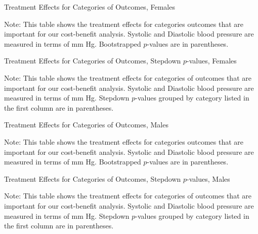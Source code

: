 



\begin{table}[htbp]
\begin{center}
	\caption{Treatment Effects for Categories of Outcomes, Females}\label{tab:select-female}
		\scalebox{0.9}{}
\end{center}
\raggedright \footnotesize
Note: This table shows the treatment effects for categories outcomes that are important for our cost-benefit analysis. Systolic and Diastolic blood pressure are measured in terms of mm Hg. Bootstrapped $p$-values are in parentheses. 
\end{table}

\begin{table}[htbp]
\begin{center}
	\caption{Treatment Effects for Categories of Outcomes, Stepdown $p$-values, Females}\label{tab:select-female-sd}
		\scalebox{0.9}{}
\end{center}
\raggedright \footnotesize
Note: This table shows the treatment effects for categories of outcomes that are important for our cost-benefit analysis. Systolic and Diastolic blood pressure are measured in terms of mm Hg. Stepdown $p$-values grouped by category listed in the first column are in parentheses.
\end{table}

\begin{table}[htbp]
\begin{center}
	\caption{Treatment Effects for Categories of Outcomes, Males}\label{tab:select-male}
		\scalebox{0.9}{}
\end{center}
\raggedright \footnotesize
Note: This table shows the treatment effects for categories outcomes that are important for our cost-benefit analysis. Systolic and Diastolic blood pressure are measured in terms of mm Hg. Bootstrapped $p$-values are in parentheses. 
\end{table}

\begin{table}[htbp]
\begin{center}
	\caption{Treatment Effects for Categories of Outcomes, Stepdown $p$-values, Males}\label{tab:select-male-sd}
		\scalebox{0.9}{}
\end{center}
\raggedright \footnotesize
Note: This table shows the treatment effects for categories of outcomes that are important for our cost-benefit analysis. Systolic and Diastolic blood pressure are measured in terms of mm Hg. Stepdown $p$-values grouped by category listed in the first column are in parentheses.
\end{table}

